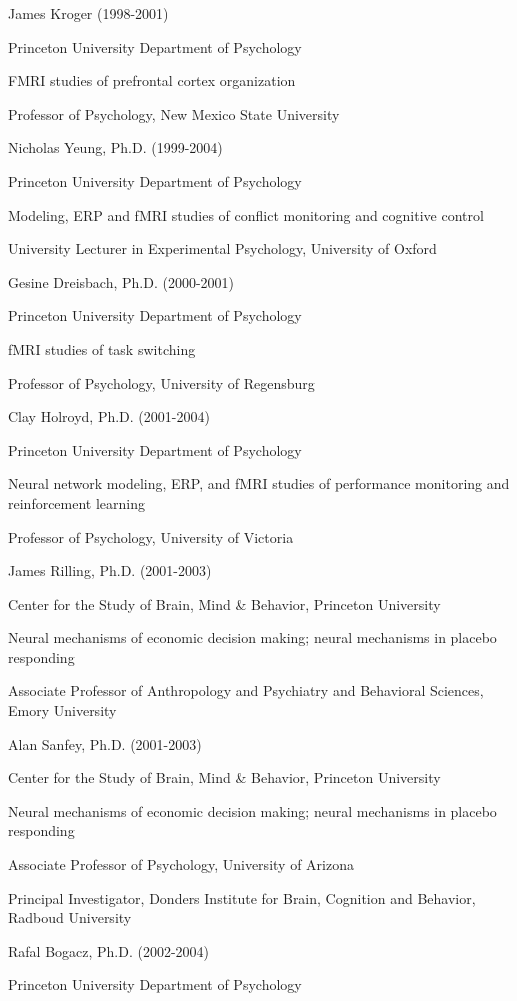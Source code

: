\documentclass[10 pt]{article}
\begin{document}
James Kroger (1998-2001)

Princeton University Department of Psychology

FMRI studies of prefrontal cortex organization

Professor of Psychology, New Mexico State University
    \medskip

Nicholas Yeung, Ph.D. (1999-2004)

Princeton University Department of Psychology

Modeling, ERP and fMRI studies of conflict monitoring and cognitive control

University Lecturer in Experimental Psychology, University of Oxford
    \medskip

Gesine Dreisbach, Ph.D. (2000-2001)

Princeton University Department of Psychology

fMRI studies of task switching

Professor of Psychology, University of Regensburg
    \medskip

Clay Holroyd, Ph.D. (2001-2004)

Princeton University Department of Psychology

Neural network modeling, ERP, and fMRI studies of performance monitoring and reinforcement learning

Professor of Psychology, University of Victoria
    \medskip

James Rilling, Ph.D. (2001-2003)

Center for the Study of Brain, Mind \& Behavior, Princeton University

Neural mechanisms of economic decision making; neural mechanisms in placebo responding

Associate Professor of Anthropology and Psychiatry and Behavioral Sciences, Emory University
    \medskip

Alan Sanfey, Ph.D. (2001-2003)

Center for the Study of Brain, Mind \& Behavior, Princeton University

Neural mechanisms of economic decision making; neural mechanisms in placebo responding

Associate Professor of Psychology, University of Arizona

Principal Investigator, Donders Institute for Brain, Cognition and Behavior, Radboud University
    \medskip

Rafal Bogacz, Ph.D. (2002-2004)

Princeton University Department of Psychology
\end{document}
